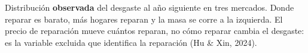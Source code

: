 \documentclass[border=0pt]{standalone}
\begin{document}
\begin{minipage}{26.783cm}\fontsize{20}{24.8}\selectfont\raggedright 
Distribución \textbf{observada} del desgaste al año siguiente en tres mercados.
Donde reparar es barato, más hogares reparan y la masa se corre a la izquierda. El
precio de reparación mueve cuántos reparan, no cómo reparar cambia el desgaste: es la
variable excluida que identifica la reparación (Hu \& Xin, 2024).
\end{minipage}
\end{document}
